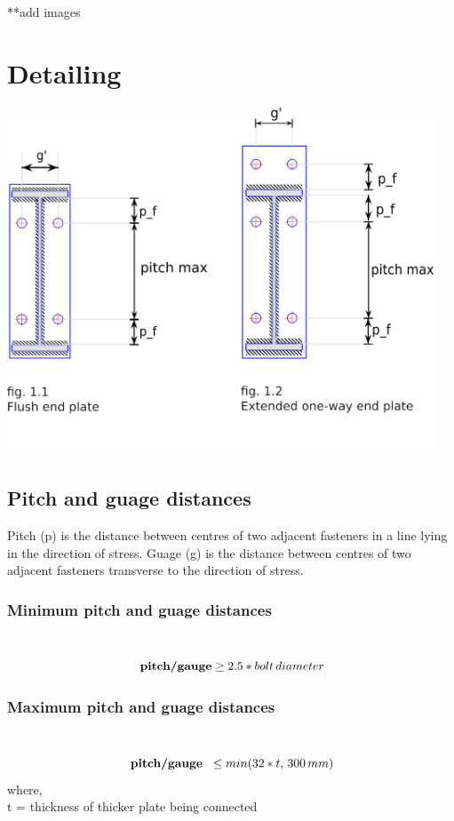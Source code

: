 \documentclass[11.5pt,a4paper,oneside]{report}
\begin{document}
\begin{Form}
**add images
\chapter{Detailing}
	{\centering
	\includegraphics[width=5in]{svg_drawingFPEOW.png} \\}

\section{Pitch and guage distances}
	Pitch (p) is the distance between centres of two adjacent fasteners in a line lying in the direction of stress.
	Guage (g) is the distance between centres of two adjacent fasteners transverse to the direction of stress.

\subsection{Minimum pitch and guage distances}
	\indent [Reference: Cl. 10.2.2, IS 800 : 2007]\\
		\begin{equation}
			 \textbf{\,pitch/gauge} \ge 2.5 * bolt\, diameter
		\end{equation}
				
\subsection{Maximum pitch and guage distances}
\indent [Reference: Cl. 10.2.3, IS 800 : 2007]\\				
		\begin{equation}
			\textbf{\,pitch/gauge \,} \leq min(32 * t,\, 300\, mm)
		\end{equation}
		where, \\
			\qquad t = thickness of thicker plate being connected 


\end{Form}
\end{document}
